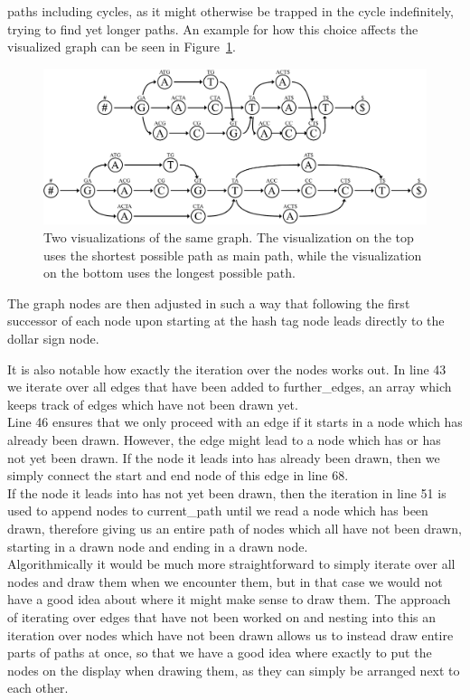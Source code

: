 \documentclass[a4paper,12pt,twoside,BCOR=10mm]{scrbook}
\begin{document}
paths including cycles, as it might otherwise be trapped in the cycle indefinitely,
trying to find yet longer paths.
An example for how this choice affects
the visualized graph can be seen in Figure~\ref{fig:evo_fig_visualize_short_vs_long}.
\begin{figure}[!htb]
\centering
\includegraphics[width=\textwidth]{evo_fig_visualize_short_vs_long.pdf}
\caption[Visualizations of graph with shortest and longest main paths]{Two visualizations of the same graph. The visualization on the top uses the shortest possible path as main path, while the visualization on the bottom uses the longest possible path.} \label{fig:evo_fig_visualize_short_vs_long}
\end{figure}
The graph nodes are then adjusted in such a way that following the first successor of each
node upon starting at the hash tag node leads directly to the dollar sign node.

It is also notable how exactly the iteration over the nodes works out.
In line 43 we iterate over all edges that have been added to further\_edges,
an array which keeps track of edges which have not been drawn yet. \\
Line 46 ensures that we only proceed with an edge
if it starts in a node which has already been drawn.
However, the edge might lead to a node which has or has not yet been drawn.
If the node it leads into has already been drawn, then we simply connect
the start and end node of this edge in line 68. \\
If the node it leads into has not yet been drawn, then the iteration in line 51 is
used to append nodes to current\_path until we read a node which has been drawn,
therefore giving us an entire path of nodes which all have not been drawn,
starting in a drawn node and ending in a drawn node. \\
Algorithmically it would be much more straightforward to simply iterate over all nodes
and draw them when we encounter them, but in that case we would not have a good idea about
where it might make sense to draw them. The approach of iterating over edges
that have not been worked on and nesting into this an iteration over nodes which have not been drawn
allows us to instead draw entire parts of paths at once, so that we have a good idea
where exactly to put the nodes on the display when drawing them, as they can simply
be arranged next to each other.
\end{document}

